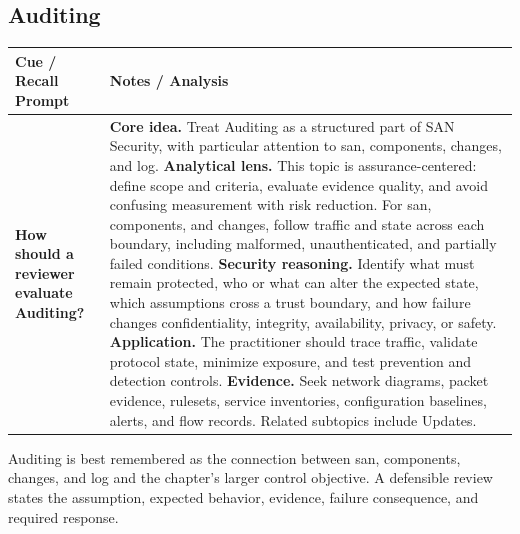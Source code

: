 \documentclass[11pt]{article}
\newcommand{\CornellHeader}{%
\rowcolor{Navy}\color{white}\bfseries Cue / Recall Prompt & \color{white}\bfseries Notes / Analysis\\\hline}
\newcommand{\CornellRow}[2]{%
\cellcolor{CueGray}\RaggedRight\textbf{#1} & \RaggedRight #2\\\hline}
\begin{document}
\subsection*{Auditing}
\begin{longtable}{>{\RaggedRight\arraybackslash}p{}|>{\RaggedRight\arraybackslash}p{}}
\CornellHeader
\CornellRow{How should a reviewer evaluate Auditing?}{\textbf{Core idea.} Treat Auditing as a structured part of SAN Security, with particular attention to san, components, changes, and log. \textbf{Analytical lens.} This topic is assurance-centered: define scope and criteria, evaluate evidence quality, and avoid confusing measurement with risk reduction. For san, components, and changes, follow traffic and state across each boundary, including malformed, unauthenticated, and partially failed conditions. \textbf{Security reasoning.} Identify what must remain protected, who or what can alter the expected state, which assumptions cross a trust boundary, and how failure changes confidentiality, integrity, availability, privacy, or safety. \textbf{Application.} The practitioner should trace traffic, validate protocol state, minimize exposure, and test prevention and detection controls. \textbf{Evidence.} Seek network diagrams, packet evidence, rulesets, service inventories, configuration baselines, alerts, and flow records. Related subtopics include Updates.}
\end{longtable}
\begin{topicsummary}
Auditing is best remembered as the connection between san, components, changes, and log and the chapter's larger control objective. A defensible review states the assumption, expected behavior, evidence, failure consequence, and required response.
\end{topicsummary}
\end{document}
